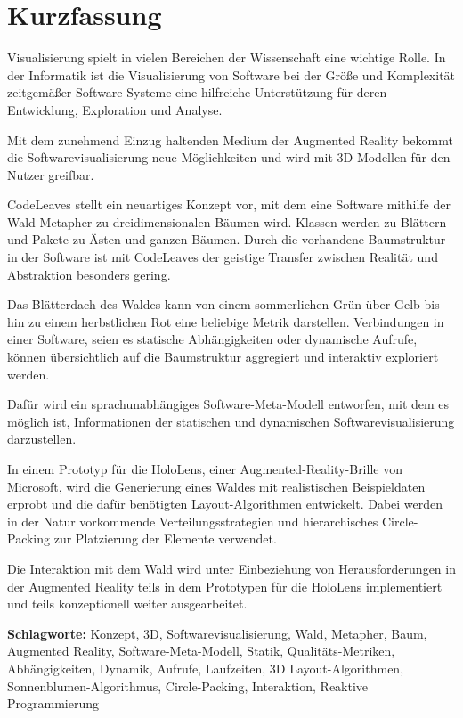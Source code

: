 \chapter*{Kurzfassung}
\thispagestyle{empty}

Visualisierung spielt in vielen Bereichen der Wissenschaft eine wichtige Rolle. In der Informatik ist die Visualisierung von Software bei der Größe und Komplexität zeitgemäßer Software-Systeme eine hilfreiche Unterstützung für deren Entwicklung, Exploration und Analyse.

Mit dem zunehmend Einzug haltenden Medium der Augmented Reality bekommt die Softwarevisualisierung neue Möglichkeiten und wird mit 3D Modellen für den Nutzer greifbar.

CodeLeaves stellt ein neuartiges Konzept vor, mit dem eine Software mithilfe der Wald-Metapher zu dreidimensionalen Bäumen wird. Klassen werden zu Blättern und Pakete zu Ästen und ganzen Bäumen. Durch die vorhandene Baumstruktur in der Software ist mit CodeLeaves der geistige Transfer zwischen Realität und Abstraktion besonders gering.

Das Blätterdach des Waldes kann von einem sommerlichen Grün über Gelb bis hin zu einem herbstlichen Rot eine beliebige Metrik darstellen. Verbindungen in einer Software, seien es statische Abhängigkeiten oder dynamische Aufrufe, können übersichtlich auf die Baumstruktur aggregiert und interaktiv exploriert werden.

Dafür wird ein sprachunabhängiges Software-Meta-Modell entworfen, mit dem es möglich ist, Informationen der statischen und dynamischen Softwarevisualisierung darzustellen.

In einem Prototyp für die HoloLens, einer Augmented-Reality-Brille von Microsoft, wird die Generierung eines Waldes mit realistischen Beispieldaten erprobt und die dafür benötigten Layout-Algorithmen entwickelt. Dabei werden in der Natur vorkommende Verteilungsstrategien und hierarchisches Circle-Packing zur Platzierung der Elemente verwendet.

Die Interaktion mit dem Wald wird unter Einbeziehung von Herausforderungen in der Augmented Reality teils in dem Prototypen für die HoloLens implementiert und teils konzeptionell weiter ausgearbeitet.

\bigskip
\noindent \textbf{Schlagworte:} Konzept, 3D, Softwarevisualisierung, Wald, Metapher, Baum, Augmented Reality, Software-Meta-Modell, Statik, Qualitäts-Metriken, Abhängigkeiten, Dynamik, Aufrufe, Laufzeiten, 3D Layout-Algorithmen, Sonnenblumen-Algorithmus, Circle-Packing, Interaktion, Reaktive Programmierung
